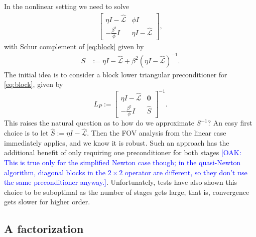 \documentclass[a4paper,10pt]{article}
\newcommand{\tcb}{\textcolor{blue}}
\begin{document}
In the nonlinear setting we need to solve
%
\begin{align}\label{eq:block}
\begin{bmatrix} \eta I - \widehat{\mathcal{L}} & \phi I\\
	-\frac{\beta^2}{\phi} I & \eta I - \widehat{\mathcal{L}}\end{bmatrix},
\end{align}
%
with Schur complement of \eqref{eq:block} given by
%
\begin{align}\label{eq:simpSchur}
S & := \eta I - \widehat{\mathcal{L}} + \beta^2 (\eta I - \widehat{\mathcal{L}})^{-1}.
\end{align}
%
The initial idea is to consider a block lower triangular preconditioner for \eqref{eq:block},
given by
%
\begin{equation}\label{eq:Lprec}
L_P := \begin{bmatrix} \eta I - \widehat{\mathcal{L}} & \mathbf{0} \\ -\frac{\beta^2}{\phi} I
	& \widehat{S}\end{bmatrix}^{-1}.
\end{equation}
%
This raises the natural question as to how do we approximate $S^{-1}?$ An easy first
choice is to let $\widehat{S} := \eta I - \widehat{\mathcal{L}}$. Then the FOV analysis
from the linear case immediately applies, and we know it is robust. Such an approach has
the additional benefit of only requiring one preconditioner for both stages \tcb{[OAK: This is true only for the simplified Newton case though; in the quasi-Newton algorithm, diagonal blocks in the $2 \times 2$ operator are different, so they don't use the same preconditioner anyway.]}. Unfortunately,
tests have also shown this choice to be suboptimal as the number of stages gets large,
that is, convergence gets slower for higher order.

\subsection{A factorization}
\end{document}
